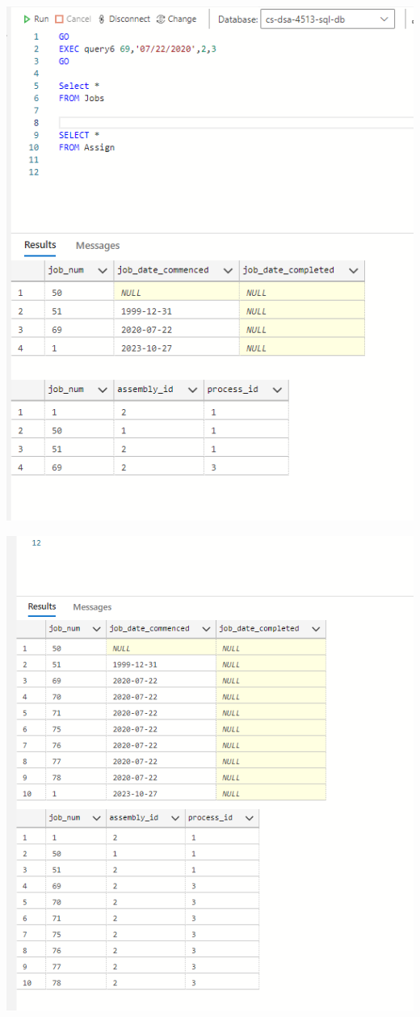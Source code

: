 \documentclass[11pt]{article}
\begin{document}
\begin{enumerate}
\includegraphics[width = \textwidth]{insertJobs3.png}

\includegraphics[width = \textwidth]{insertJobs4.png}


\end{enumerate}
\end{document}
